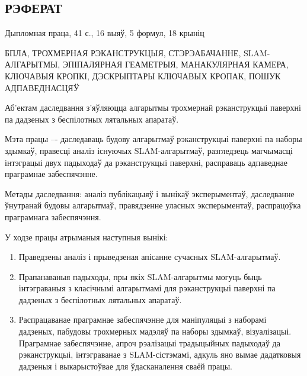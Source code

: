 \begin{titlepage}
    \begin{center}
        \section*{РЭФЕРАТ}
    \end{center}

    \vspace{10mm}

    Дыпломная праца, 41 с., 16 выяў, 5 формул, 18 крыніц

    \vspace{4mm}

    БПЛА, ТРОХМЕРНАЯ РЭКАНСТРУКЦЫЯ, СТЭРЭАБАЧАННЕ, SLAM-АЛГАРЫТМЫ,
    ЭПІПАЛЯРНАЯ ГЕАМЕТРЫЯ, МАНАКУЛЯРНАЯ КАМЕРА, КЛЮЧАВЫЯ КРОПКІ,
    ДЭСКРЫПТАРЫ КЛЮЧАВЫХ КРОПАК, ПОШУК АДПАВЕДНАСЦЯЎ

    \vspace{4mm}

    Аб'ектам даследвання з'яўляюцца алгарытмы трохмернай рэканструкцыі паверхні
    па дадзеных з беспілотных лятальных апаратаў.

    \vspace{4mm}

    Мэта працы –- даследаваць будову алгарытмаў рэканструкцыі паверхні па наборы здымкаў,
    правесці аналіз існуючых SLAM-алгарытмаў, разгледзець магчымасці інтэграцыі двух падыходаў
    да рэканструкцыі паверхні, расправаць адпаведнае праграмнае забеспячэнне.

    \vspace{4mm}

    Метады даследвання: аналіз публікацыяў і вынікаў эксперыментаў,
    даследванне ўнутранай будовы алгарытмаў,
    правядзенне уласных эксперыментаў, распрацоўка праграмнага забеспячэння.

    \vspace{4mm}

    У ходзе працы атрыманыя наступныя вынікі:

    \vspace{4mm}

    \begin{enumerate}
        \item Праведзены аналіз і прыведзеная апісанне сучасных SLAM-алгарытмаў.
        \item Прапанаваныя падыходы, пры якіх SLAM-алгарытмы могуць быць інтэграваныя з
        класічнымі алгарытмамі для рэканструкцыі паверхні па дадзеных з беспілотных лятальных апаратаў.
        \item Распрацаванае праграмнае забеспячэнне для маніпуляцыі з наборамі дадзеных,
        пабудовы трохмерных мадэляў па наборы здымкаў, візуалізацыі. Праграмнае забеспячэнне,
        апроч рэалізацыі традыцыйных падыходаў да рэканструкцыі, інтэграванае з SLAM-сістэмамі,
        адкуль яно вымае дадатковыя дадзеныя і выкарыстоўвае для ўдасканалення сваёй працы.
    \end{enumerate}


\end{titlepage}
